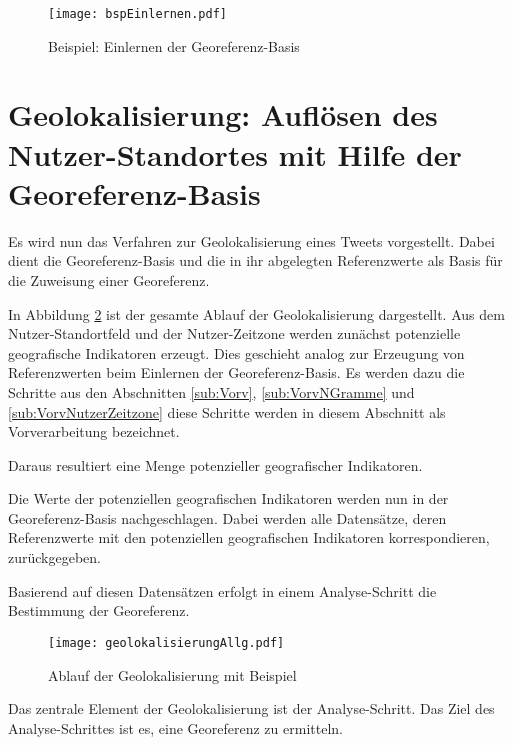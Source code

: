 			\begin{figure}[H]
				\begin{center}
				\texttt{[image: bspEinlernen.pdf]}
				\caption{Beispiel: Einlernen der Georeferenz-Basis}
				\label{img:bspEinlernen}
				\end{center}
			\end{figure}	
				

	\section{Geolokalisierung: Auflösen des Nutzer-Standortes mit Hilfe der Georeferenz-Basis} \label{sec:AufloesenDesNutzerStandortes} 

		Es wird nun das Verfahren zur Geolokalisierung eines Tweets vorgestellt.
		Dabei dient die Georeferenz-Basis und die in ihr abgelegten Referenzwerte als Basis für die Zuweisung einer Georeferenz.

		In Abbildung \ref{img:ablaufGeolok} ist der gesamte Ablauf der Geolokalisierung dargestellt.
		Aus dem Nutzer-Standortfeld und der Nutzer-Zeitzone werden zunächst potenzielle geografische Indikatoren erzeugt.
		Dies geschieht analog zur Erzeugung von Referenzwerten beim Einlernen der Georeferenz-Basis.
		Es werden dazu die Schritte aus den Abschnitten \ref{sub:Vorv}, \ref{sub:VorvNGramme} und \ref{sub:VorvNutzerZeitzone} diese Schritte werden in diesem Abschnitt als Vorverarbeitung bezeichnet.
		
		Daraus resultiert eine Menge potenzieller geografischer Indikatoren.
		
		Die Werte der potenziellen geografischen Indikatoren werden nun in der Georeferenz-Basis nachgeschlagen. 
		Dabei werden alle Datensätze, deren Referenzwerte mit den potenziellen geografischen Indikatoren korrespondieren, zurückgegeben.
		
		Basierend auf diesen Datensätzen erfolgt in einem Analyse-Schritt die Bestimmung der Georeferenz.

			\begin{figure} 
			\begin{center}
						\texttt{[image: geolokalisierungAllg.pdf]}
						\caption{Ablauf der Geolokalisierung mit Beispiel}
						\label{img:ablaufGeolok}
					\end{center}
			\end{figure}	

		Das zentrale Element der Geolokalisierung ist der Analyse-Schritt. 
		Das Ziel des Analyse-Schrittes ist es, eine Georeferenz zu ermitteln.
	
